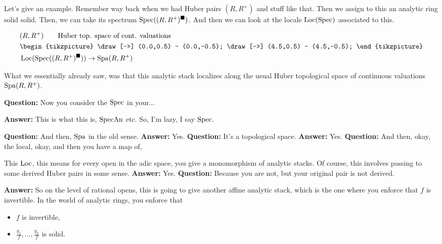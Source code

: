 \begin{example}

Let's give an example. Remember way back when we had Huber pairs $(R, R^{+})$ and stuff like that. Then we assign to this an analytic ring solid  solid. Then, we can take its spectrum $\operatorname{Spec}((R, R^{+})^\blacksquare)$. And then we can look at the locale $\operatorname{Loc}(\operatorname{Spec})$ associated to this.

\[
\begin{aligned}
    &(R, R^{+}) \quad \quad \text{Huber top. space of cont. valuations} \\
    &\begin{tikzpicture}
        \draw[->] (0.0,0.5) -- (0.0,-0.5);
        \draw[->] (4.5,0.5) -- (4.5,-0.5);
    \end{tikzpicture} \\
    &\Loc(\Spec((R, R^{+})^\solid)) \rightarrow \Spa(R, R^{+})
\end{aligned}
\]

 What we essentially already saw, was that this analytic stack localizes along the usual Huber topological space of continuous valuations $\operatorname{Spa}(R, R^{+})$.
\end{example}

\textbf{Question:} Now you consider the $\operatorname{Spec}$ in your...

\textbf{Answer:} This is what this is,  $\operatorname{SpecAn}$ etc. So, I'm lazy, I say $\operatorname{Spec}$.

\textbf{Question:} And then, $\operatorname{Spa}$ in the old sense.
\textbf{Answer:} Yes. 
\textbf{Question:} It's a topological space.
\textbf{Answer:} Yes. 
\textbf{Question:} And then, okay, the local, okay, and then you have a map of, 

This $\operatorname{Loc}$, this means for every open in the adic space, you give a monomorphism of analytic stacks. Of course, this involves passing to some derived Huber pairs in some sense.
\textbf{Answer:} Yes. 
\textbf{Question:} Because you are not, but your original pair is not derived.

\textbf{Answer:} So on the level of rational opens, this is going to give another affine analytic stack, which is the one where you enforce that $f$ is invertible. In the world of analytic rings, you enforce that 
\begin{itemize}
\item $f$ is invertible,
\item $\frac{g_1}{f}, ..., \frac{g_n}{f}$ is solid.
\end{itemize}

